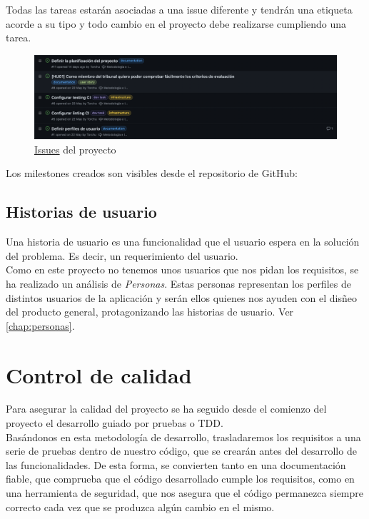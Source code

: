 Todas las tareas estarán asociadas a una issue diferente y tendrán una etiqueta acorde a su tipo y todo cambio en el
proyecto debe realizarse cumpliendo una tarea.
\begin{figure}[H]
	\centering	
	\includegraphics[scale=0.25]{img/issues.png}
	\caption{\href{https://github.com/Torchu/flixbuff/issues}{Issues} del proyecto}\label{fig:github_issues}
\end{figure}

Los milestones creados son visibles desde el repositorio de GitHub:

\subsection{Historias de usuario}
Una historia de usuario es una funcionalidad que el usuario espera en la solución del problema. Es decir, un
requerimiento del usuario.\\


Como en este proyecto no tenemos unos usuarios que nos pidan los requisitos, se ha realizado un análisis de
\textit{Personas}\cite{personas}. Estas personas representan los perfiles de distintos usuarios de la aplicación y
serán ellos quienes nos ayuden con el disñeo del producto general, protagonizando las historias de usuario. Ver
\autoref{chap:personas}.\\

\section{Control de calidad}\label{sec:control_de_calidad}
Para asegurar la calidad del proyecto se ha seguido desde el comienzo del proyecto el desarrollo guiado por pruebas o
TDD\cite{TDD}.\\

Basándonos en esta metodología de desarrollo, trasladaremos los requisitos a una serie de pruebas dentro de nuestro
código, que se crearán antes del desarrollo de las funcionalidades. De esta forma, se convierten tanto en una
documentación fiable, que comprueba que el código desarrollado cumple los requisitos, como en una herramienta de
seguridad, que nos asegura que el código permanezca siempre correcto cada vez que se produzca algún cambio en el
mismo.\\

